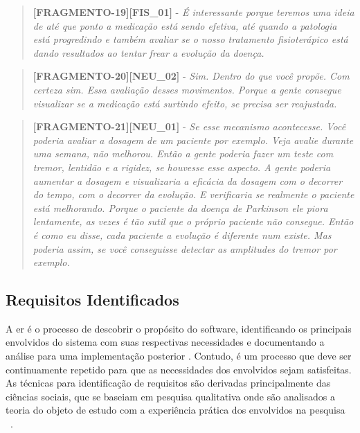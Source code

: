 \begin{quote}
\textbf{[FRAGMENTO-19][FIS\_01]} - 
\emph{
 É interessante porque teremos uma ideia de até que ponto a medicação está sendo efetiva, até quando a patologia está progredindo e também avaliar se o nosso tratamento fisioterápico está dando resultados ao tentar frear a evolução da doença.
}
\end{quote}


\begin{quote}
\textbf{[FRAGMENTO-20][NEU\_02]} - 
\emph{
Sim. Dentro do que você propõe. Com certeza sim. Essa avaliação desses movimentos. Porque a gente consegue visualizar se a medicação está surtindo efeito, se precisa ser reajustada.
}
\end{quote}

\begin{quote}
\textbf{[FRAGMENTO-21][NEU\_01]} - 
\emph{
Se esse mecanismo acontecesse. Você poderia avaliar a dosagem de um paciente por exemplo. Veja avalie durante uma semana, não melhorou. Então a gente poderia fazer um teste com tremor, lentidão e a rigidez, se houvesse esse aspecto.  A gente poderia aumentar a dosagem e visualizaria a eficácia da dosagem com o decorrer do tempo, com o decorrer da evolução. E verificaria se realmente o paciente está melhorando. Porque o paciente da doença de Parkinson ele piora lentamente, as vezes é tão sutil que o próprio paciente não consegue. Então é como eu disse, cada paciente a evolução é diferente num existe. Mas poderia assim, se você conseguisse detectar as amplitudes do tremor por exemplo.
}
\end{quote}


\subsection{Requisitos Identificados}
A \ac{er} é o processo de descobrir o propósito do software, identificando os principais envolvidos do sistema com suas respectivas necessidades e documentando a análise para uma implementação posterior \cite{bas00}. Contudo, é um processo que deve ser continuamente repetido para que as necessidades dos envolvidos sejam satisfeitas. As técnicas para identificação de requisitos são derivadas principalmente das ciências sociais, que se baseiam em pesquisa qualitativa onde são analisados a teoria do objeto de estudo com a experiência prática dos envolvidos na pesquisa ~\cite{elicquest05,zowghi2005}.

